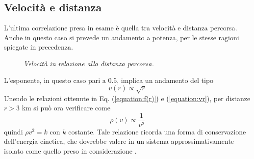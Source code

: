 \documentclass[12pt,a4paper]{article}
\begin{document}
\subsection{Velocità e distanza}
L'ultima correlazione presa in esame è quella tra velocità e distanza percorsa. Anche in questo caso si prevede un andamento a potenza, per le stesse ragioni spiegate in precedenza.
\begin{figure}[H]
\centering
{}
\caption{\emph{Velocità in relazione alla distanza percorsa.}}
\label{figure:vel_dist}
\end{figure}
L'esponente, in questo caso pari a $0.5$, implica un andamento del tipo
\begin{equation}
v(r)\propto\sqrt{r}
\label{equation:vr}
\end{equation}
Unendo le relazioni ottenute in Eq. (\ref{equation:f(r)}) e (\ref{equation:vr}), per distanze $r>3$ km si può ora verificare come
\begin{equation}
\rho(v)\propto \frac{1}{v^2}
\label{equation:rho_v}
\end{equation}
quindi $\rho v^2=k$ con $k$ costante. Tale relazione ricorda una forma di conservazione dell'energia cinetica, che dovrebbe valere in un sistema approssimativamente isolato come quello preso in considerazione \cite{DeepGravity}.
\end{document}
